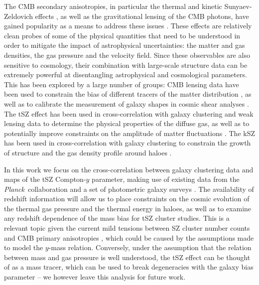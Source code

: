 \documentclass[useAMS,usenatbib]{mn2e}
\def\planck{{\it Planck\/}}
\begin{document}
  The CMB secondary anisotropies, in particular the thermal and kinetic Sunyaev-Zeldovich effects \citep[tSZ and kSZ respectively,][]{1972CoASP...4..173S}, as well as the gravitational lensing of the CMB photons, have gained popularity as a means to address these issues \citep{2017JCAP...11..040B,2019BAAS...51c.297B}. These effects are relatively clean probes of some of the physical quantities that need to be understood in order to mitigate the impact of astrophysical uncertainties: the matter and gas densities, the gas pressure and the velocity field. Since these observables are also sensitive to cosmology, their combination with large-scale structure data can be extremely powerful at disentangling astrophysical and cosmological parameters. This has been explored by a large number of groups: CMB lensing data have been used to constrain the bias of different tracers of the matter distribution \citep[e.g.][]{2019MNRAS.485.1720H,2018JCAP...04..053A,2018arXiv181002322A,2018MNRAS.481.1133P}, as well as to calibrate the measurement of galaxy shapes in cosmic shear analyses \citep{2019PhRvD.100b3541A}. The tSZ effect has been used in cross-correlation with galaxy clustering and weak lensing data to determine the physical properties of the diffuse gas, as well as to potentially improve constraints on the amplitude of matter fluctuations \citep{2014PhRvD..89b3508V,2014JCAP...02..030H,2015JCAP...09..046M,2017MNRAS.471.1565H,2017ApJ...845...71A,2018PhRvD..97f3514A,2018MNRAS.480.3928M,2019A&A...624A..48D,2019MNRAS.483..223T,2019arXiv190306654T,2019arXiv190413347P,2019arXiv190707870M}. The kSZ has been used in cross-correlation with galaxy clustering to constrain the growth of structure and the gas density profile around haloes \citep{2016PhRvD..93h2002S,2016A&A...586A.140P,2016PhRvL.117e1301H,2016MNRAS.461.3172S,2017JCAP...03..008D}.
  
  In this work we focus on the cross-correlation between galaxy clustering data and maps of the tSZ Compton-$y$ parameter, making use of existing data from the \planck\ collaboration \citep{2016A&A...594A..22P} and a set of photometric galaxy surveys \citep{2014ApJS..210....9B,2016ApJS..225....5B}. The availability of redshift information will allow us to place constraints on the cosmic evolution of the thermal gas pressure and the thermal energy in haloes, as well as to examine any redshift dependence of the mass bias for tSZ cluster studies. This is a relevant topic given the current mild tensions between SZ cluster number counts and CMB primary anisotropies \citep{2016A&A...594A..24P,2016ApJ...832...95D,2019ApJ...878...55B,2019arXiv190407887Z}, which could be caused by the assumptions made to model the $y$-mass relation. Conversely, under the assumption that the relation between mass and gas pressure is well understood, the tSZ effect can be thought of as a mass tracer, which can be used to break degeneracies with the galaxy bias parameter -- we however leave this analysis for future work.
\end{document}
